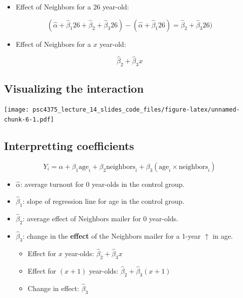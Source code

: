 \documentclass[
]{article}
\providecommand{\tightlist}{%
  \setlength{\itemsep}{0pt}\setlength{\parskip}{0pt}}
\begin{document}
\begin{itemize}
\tightlist
\item
  Effect of Neighbors for a 26 year-old: \vspace{-10pt}
\end{itemize}

\[
(\hat{\alpha} + \hat{\beta}_1 26 + \hat{\beta}_2 + \hat{\beta}_3 26) - (\hat{\alpha} + \hat{\beta}_1 26) = \hat{\beta}_2 + \hat{\beta}_3 26)
\]

\begin{itemize}
\tightlist
\item
  Effect of Neighbors for a \(x\) year-old: \vspace{-10pt}
\end{itemize}

\[
\hat{\beta}_2 + \hat{\beta}_3 x
\]

\subsection{Visualizing the
interaction}\label{visualizing-the-interaction}

\texttt{[image: psc4375\_lecture\_14\_slides\_code\_files/figure-latex/unnamed-chunk-6-1.pdf]}

\subsection{Interpretting
coefficients}\label{interpretting-coefficients}

\[
Y_i = \alpha + \beta_1\text{age}_i + \beta_2 \text{neighbors}_i + \beta_3 (\text{age}_i \times \text{neighbors}_i)
\]

\begin{itemize}
\tightlist
\item
  \(\hat{\alpha}\): average turnout for 0 year-olds in the control
  group.
\item
  \(\hat{\beta}_1\): slope of regression line for age in the control
  group.
\item
  \(\hat{\beta}_2\): average effect of Neighbors mailer for 0 year-olds.
\item
  \(\hat{\beta}_3\): change in the \textbf{effect} of the Neighbors
  mailer for a 1-year \(\uparrow\) in age.

  \begin{itemize}
  \tightlist
  \item
    Effect for \(x\) year-olds: \(\hat{\beta}_2 + \hat{\beta}_3 x\)
  \item
    Effect for \((x+1)\) year-olds:
    \(\hat{\beta}_2 + \hat{\beta}_3 (x+1)\)
  \item
    Change in effect: \(\hat{\beta}_3\)
  \end{itemize}
\end{itemize}
\end{document}
